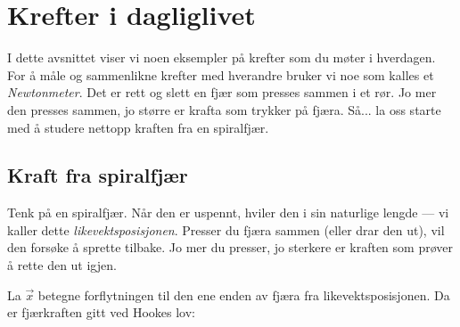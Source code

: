 \section{Krefter i dagliglivet}
I dette avsnittet viser vi noen eksempler på krefter som du møter i hverdagen.
For å måle og sammenlikne krefter med hverandre bruker vi noe som kalles et \textit{Newtonmeter}. Det er rett og slett en fjær som presses sammen i et rør. Jo mer den presses sammen, jo større er krafta som trykker på fjæra. Så... la oss starte med å studere nettopp kraften fra en spiralfjær.

\subsection{Kraft fra spiralfjær}
Tenk på en spiralfjær. Når den er uspennt, hviler den i sin naturlige lengde — vi kaller dette \textit{likevektsposisjonen}. Presser du fjæra sammen (eller drar den ut), vil den forsøke å sprette tilbake. Jo mer du presser, jo sterkere er kraften som prøver å rette den ut igjen.

La $\vec{x}$ betegne forflytningen til den ene enden av fjæra fra likevektsposisjonen. Da er fjærkraften gitt ved Hookes lov:


